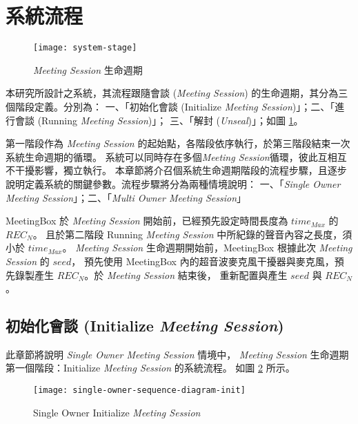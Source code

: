\section{系統流程}

\begin{figure}[H]
    \centering
    \texttt{[image: system-stage]}
    \caption{{\it Meeting Session} 生命週期}
    \label{fig.system-stage}
\end{figure}

    本研究所設計之系統，其流程跟隨會談 ({\it Meeting Session}) 的生命週期，其分為三個階段定義。分別為：
一、「初始化會談 (Initialize {\it Meeting Session})」；二、「進行會談 (Running {\it Meeting Session})」；
三、「解封 ({\it Unseal})」；如圖 \ref{fig.system-stage}。

    第一階段作為 {\it Meeting Session} 的起始點，各階段依序執行，於第三階段結束一次系統生命週期的循環。
系統可以同時存在多個{\it Meeting Session}循環，彼此互相互不干擾影響，獨立執行。
本章節將介召個系統生命週期階段的流程步驟，且逐步說明定義系統的關鍵參數。流程步驟將分為兩種情境說明：
一、「{\it Single Owner Meeting Session}」；二、「{\it Multi Owner Meeting Session}」

    MeetingBox 於 {\it Meeting Session} 開始前，已經預先設定時間長度為 $time_{Max}$ 的 $REC_{N}$。
且於第二階段 Running {\it Meeting Session} 中所紀錄的聲音內容之長度，須小於  $time_{Max}$。
{\it Meeting Session} 生命週期開始前，MeetingBox 根據此次 {\it Meeting Session} 的 $seed$，
預先使用 MeetingBox 內的超音波麥克風干擾器與麥克風，預先錄製產生 $REC_{N}$。於 {\it Meeting Session} 結束後，
重新配置與產生 $seed$ 與 $REC_{N}$。


\subsection{初始化會談 (Initialize {\it Meeting Session})}

    此章節將說明 {\it Single Owner Meeting Session} 情境中，
{\it Meeting Session} 生命週期第一個階段：Initialize {\it Meeting Session} 的系統流程。
如圖 \ref{fig.s-o-init} 所示。

\begin{figure}[H]
    \centering
    \texttt{[image: single-owner-sequence-diagram-init]}
    \caption{Single Owner Initialize {\it Meeting Session}}
    \label{fig.s-o-init}
\end{figure}

